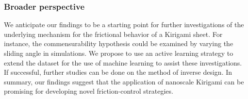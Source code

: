 \subsubsection*{Broader perspective}
We anticipate our findings to be a starting point for further investigations of the underlying mechanism for the frictional behavior of a Kirigami sheet. For instance, the commensurability hypothesis could be examined by varying the sliding angle in simulations. We propose to use an active learning strategy to extend the dataset for the use of machine learning to assist these investigations. If successful, further studies can be done on the method of inverse design. In summary, our findings suggest that the application of nanoscale Kirigami can be promising for developing novel friction-control strategies.

\newpage

